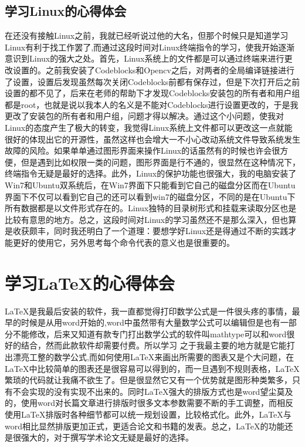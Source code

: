 \documentclass[12pt]{article}
\begin{document}
\subsection{学习Linux的心得体会}
在还没有接触Linux之前，我就已经听说过他的大名，但那个时候只是知道学习Linux有利于找工作罢了,而通过这段时间对Linux终端指令的学习，使我开始逐渐意识到Linux的强大之处。首先，Linux系统上的文件都是可以通过终端来进行更改设置的。之前我安装了Codeblocks和Opencv之后，对两者的全局编译链接进行了设置，设置后发现虽然每次关闭Codeblocks前都有保存过，但是下次打开后之前设置的都不见了，后来在老师的帮助下才发现Codeblocks安装包的所有者和用户组都是root，也就是说以我本人的名义是不能对Codeblocks进行设置更改的，于是我更改了安装包的所有者和用户组，问题才得以解决。通过这个小问题，使我对Linux的态度产生了极大的转变，我觉得Linux系统上文件都可以更改这一点就能很好的体现出它的开源性，虽然这样也会增大一不小心改动系统文件导致系统发生故障的风险。如果单单通过图形界面来操作Linux的话虽然有的时候也许会很方便，但是遇到比如权限一类的问题，图形界面是行不通的，很显然在这种情况下，终端指令无疑是最好的选择。此外，Linux的保护功能也很强大，我的电脑安装了Win7和Ubuntu双系统后，在Win7界面下只能看到它自己的磁盘分区而在Ubuntu界面下不仅可以看到它自己的还可以看到win7的磁盘分区，不同的是在Ubuntu下所有数据都是以文件形式存在的。Linux独特的目录树形式和挂载来读取分区也是比较有意思的地方。总之，这段时间对Linux的学习虽然还不是那么深入，但也算是收获颇丰，同时我还明白了一个道理：要想学好Linux还是得通过不断的实践才能更好的使用它，另外思考每个命令代表的意义也是很重要的。
\section{学习\LaTeX{}的心得体会}
\LaTeX{}是我最后安装的软件，我一直都觉得打印数学公式是一件很头疼的事情，最早的时候是从用word开始的,word中虽然带有大量数学公式可以编辑但是也有一部分不能修改，后来又知道有款专门打出数学公式的软件叫mathtype可以和word很好的结合，然而此款软件却需要付费。所以学习\Latex{} 之于我最主要的地方就是它能打出漂亮工整的数学公式,而如何使用\LaTeX{}来画出所需要的图表又是个大问题，在\LaTeX{}中比较简单的图表还是很容易可以得到的，而一旦遇到不规则表格，\LaTeX{}繁琐的代码就让我痛不欲生了。但是很显然它又有一个优势就是图形种类繁多，只有不会实现的没有实现不出来的。同时\LaTeX{}强大的排版方式也是word望尘莫及的，使用word对长篇文章进行排版时很多文本参数需要不断的手工调整，而相反使用\LaTeX{}排版时各种细节都可以统一规划设置，比较格式化。此外，\LaTeX{}与word相比显然排版更加正式，更适合论文和书籍的发表。总之，\LaTeX{}的功能还是很强大的，对于撰写学术论文无疑是最好的选择。










\end{document}

